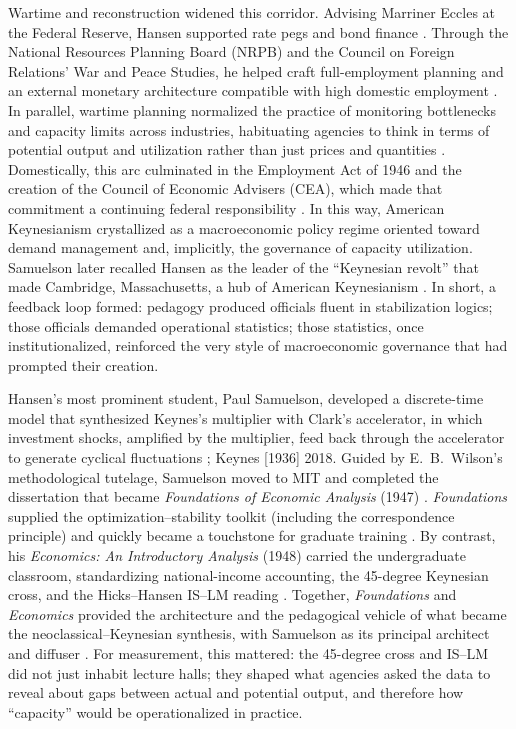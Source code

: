 \documentclass[11pt]{article}
\begin{document}
Wartime and reconstruction widened this corridor. Advising Marriner Eccles at the Federal Reserve, Hansen supported rate pegs and bond finance \citep{bogfrs1945}. Through the National Resources Planning Board (NRPB) and the Council on Foreign Relations' War and Peace Studies, he helped craft full-employment planning and an external monetary architecture compatible with high domestic employment \citep{hansen1942,nerozzi2009}. In parallel, wartime planning normalized the practice of monitoring bottlenecks and capacity limits across industries, habituating agencies to think in terms of potential output and utilization rather than just prices and quantities \citep{bogfrs1945}. Domestically, this arc culminated in the Employment Act of 1946 and the creation of the Council of Economic Advisers (CEA), which made that commitment a continuing federal responsibility \citep{bailey1950}. In this way, American Keynesianism crystallized as a macroeconomic policy regime oriented toward demand management and, implicitly, the governance of capacity utilization. Samuelson later recalled Hansen as the leader of the ``Keynesian revolt'' that made Cambridge, Massachusetts, a hub of American Keynesianism \citep{samuelson1988}. In short, a feedback loop formed: pedagogy produced officials fluent in stabilization logics; those officials demanded operational statistics; those statistics, once institutionalized, reinforced the very style of macroeconomic governance that had prompted their creation.

Hansen's most prominent student, Paul Samuelson, developed a discrete-time model that synthesized Keynes's multiplier with Clark's accelerator, in which investment shocks, amplified by the multiplier, feed back through the accelerator to generate cyclical fluctuations \citep{samuelson1939,clark1917}; Keynes [1936] 2018. Guided by E.\ B.\ Wilson's methodological tutelage, Samuelson moved to {MIT} and completed the dissertation that became \emph{Foundations of Economic Analysis} (1947) \citep{samuelson1947}. \emph{Foundations} supplied the optimization--stability toolkit (including the correspondence principle) and quickly became a touchstone for graduate training \citep{backhouse2014,backhouse2015}. By contrast, his \emph{Economics: An Introductory Analysis} (1948) carried the undergraduate classroom, standardizing national-income accounting, the 45-degree Keynesian cross, and the Hicks--Hansen IS--LM reading \citep{samuelson1948,dimand2010,pearcehoover1995}. Together, \emph{Foundations} and \emph{Economics} provided the architecture and the pedagogical vehicle of what became the neoclassical--Keynesian synthesis, with Samuelson as its principal architect and diffuser \citep{davidson2006}. For measurement, this mattered: the 45-degree cross and IS--LM did not just inhabit lecture halls; they shaped what agencies asked the data to reveal about gaps between actual and potential output, and therefore how ``capacity'' would be operationalized in practice.
\end{document}
